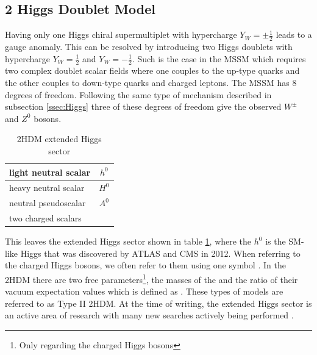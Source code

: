 	\subsection{2 Higgs Doublet Model}\label{ssec:2HDM}
		Having only one Higgs chiral supermultiplet with hypercharge $Y_W=\pm \frac{1}{2}$ leads to a gauge anomaly. This can be resolved by introducing two Higgs doublets with hypercharge $Y_W=\frac{1}{2}$ and $Y_W=-\frac{1}{2}$. Such is the case in the \gls{MSSM} which requires two complex doublet scalar fields where one couples to the up-type quarks and the other couples to down-type quarks and charged leptons. The \gls{MSSM} has 8 degrees of freedom. Following the same type of mechanism described in subsection \ref{ssec:Higgs} three of these degrees of freedom give the observed $W^\pm$ and $Z^0$ bosons. 
		\begin{table}[!thp]
				\centering
				\caption{\gls{2HDM} extended Higgs sector \cite{2HDM}}
				\begin{tabular}{| l | c |}
				\hline
				light neutral scalar 	& $h^0$ \\ \hline
				heavy neutral scalar 	& $H^0$ \\ \hline
				neutral pseudoscalar 	& $A^0$ \\ \hline
				two charged scalars 	& \Hpm \\ \hline
 				\end{tabular}
				\label{tab:2HDM}
		\end{table}
		This leaves the extended Higgs sector shown in table \ref{tab:2HDM}, where the $h^0$ is the SM-like Higgs that was discovered by \gls{ATLAS} and \gls{CMS} in 2012. When referring to the charged Higgs bosons, we often refer to them using one symbol \Hpm. In the \gls{2HDM} there are two free parameters\footnote{Only regarding the charged Higgs bosons}, the masses of the \Hpm and the ratio of their vacuum expectation values which is defined as \tanb. These types of models are referred to as Type II \gls{2HDM}. At the time of writing, the extended Higgs sector is an active area of research with many new searches actively being performed \cite{pdg}.


